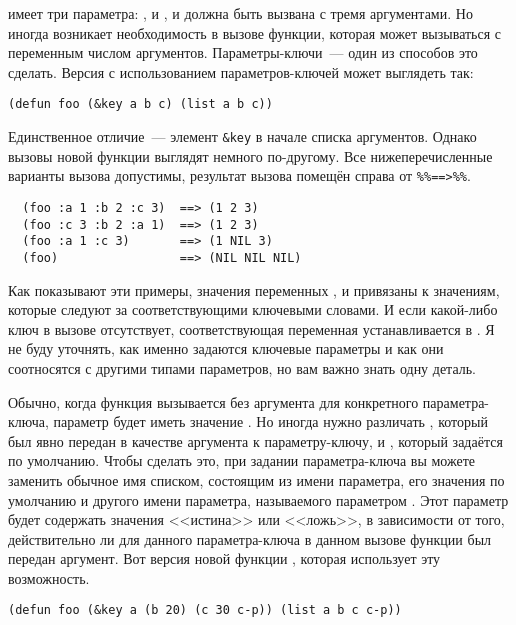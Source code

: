 имеет три параметра: ,  и , и должна быть вызвана с тремя
аргументами. Но иногда возникает необходимость в вызове функции, которая может вызываться
с переменным числом аргументов. Параметры-ключи~--- один из способов это сделать. Версия
 с использованием параметров-ключей может выглядеть так:

\begin{lstlisting}
(defun foo (&key a b c) (list a b c))
\end{lstlisting}

Единственное отличие~--- элемент \lstinline!&key! в начале списка аргументов. Однако вызовы
новой функции  выглядят немного по-другому. Все нижеперечисленные варианты
вызова  допустимы, результат вызова помещён справа от \lstinline!%%==>%%!.

\begin{verbatim}
  (foo :a 1 :b 2 :c 3)  ==> (1 2 3)
  (foo :c 3 :b 2 :a 1)  ==> (1 2 3)
  (foo :a 1 :c 3)       ==> (1 NIL 3)
  (foo)                 ==> (NIL NIL NIL)
\end{verbatim}

Как показывают эти примеры, значения переменных ,  и  привязаны
к значениям, которые следуют за соответствующими ключевыми словами. И если какой-либо
ключ в вызове отсутствует, соответствующая переменная устанавливается в . Я не
буду уточнять, как именно задаются ключевые параметры и как они соотносятся с другими
типами параметров, но вам важно знать одну деталь.

Обычно, когда функция вызывается без аргумента для конкретного параметра-ключа, параметр
будет иметь значение . Но иногда нужно различать , который был явно
передан в качестве аргумента к параметру-ключу, и , который задаётся по
умолчанию. Чтобы сделать это, при задании параметра-ключа вы можете заменить обычное имя
списком, состоящим из имени параметра, его значения по умолчанию и другого имени
параметра, называемого параметром . Этот параметр  будет
содержать значения <<истина>> или <<ложь>>, в зависимости от того, действительно ли для
данного параметра-ключа в данном вызове функции был передан аргумент. Вот версия новой
функции , которая использует эту возможность.

\begin{lstlisting}
(defun foo (&key a (b 20) (c 30 c-p)) (list a b c c-p))
\end{lstlisting}

